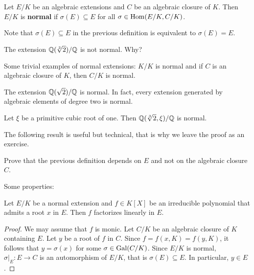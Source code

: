 \chapter{}



\begin{definition}
    Let $E/K$ be an algebraic extensions and $C$ be an algebraic closure of $K$. 
    Then $E/K$ is \textbf{normal} if 
    $\sigma(E)\subseteq E$ for all $\sigma\in\operatorname{Hom}(E/K,C/K)$. 
\end{definition}

Note that $\sigma(E)\subseteq E$ in the previous definition
is equivalent to $\sigma(E)=E$. 

\begin{example}
    The extension $\mathbb{Q}(\sqrt[3]{2})/\mathbb{Q}$ is not normal. Why?
\end{example}

Some trivial examples of normal extensions: $K/K$ is normal
and if $C$ is an algebraic closure of $K$, then $C/K$ is normal. 

\begin{example}
    The extension $\mathbb{Q}(\sqrt{2})/\mathbb{Q}$ is normal. In fact, 
    every extension generated by algebraic elements of degree two is normal. 
\end{example}

\begin{exercise}
    Let $\xi$ be a primitive cubic root of one. Then 
    $\mathbb{Q}(\sqrt[3]{2},\xi)/\mathbb{Q}$ is normal. 
\end{exercise}

The following result is useful but technical, that is why we leave the proof
as an exercise. 

\begin{exercise}
    Prove that the previous definition depends on $E$ and not on the
    algebraic closure $C$. 
\end{exercise}

Some properties:

\begin{proposition}
    Let $E/K$ be a normal extension and $f\in K[X]$ be an irreducible polynomial
    that admits a root $x$ in $E$. Then $f$ factorizes
    linearly in $E$.
\end{proposition}

\begin{proof}
    We may assume that $f$ is monic. Let $C/K$ be an algebraic closure of $K$ containing $E$. 
    Let $y$ be a root of $f$ in $C$. Since $f=f(x,K)=f(y,K)$, 
    it follows that $y=\sigma(x)$ for some $\sigma\in\operatorname{Gal}(C/K)$. Since 
    $E/K$ is normal, $\sigma|_E\colon E\to C$ is an automorphism of $E/K$, that is
    $\sigma(E)\subseteq E$. In particular, $y\in E$. 
\end{proof}

